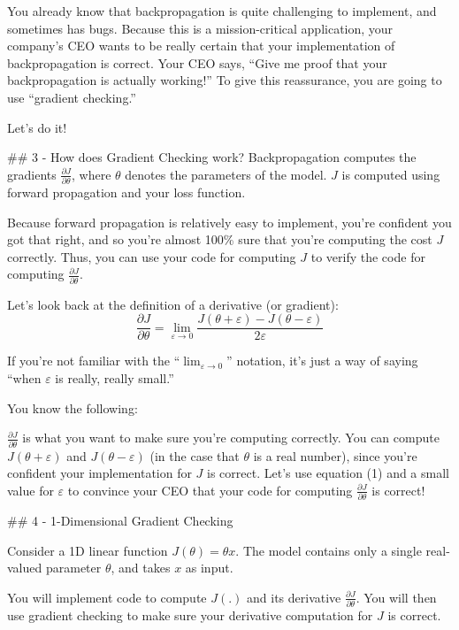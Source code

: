 \documentclass[11pt]{article}
\begin{document}
You already know that backpropagation is quite challenging to implement,
and sometimes has bugs. Because this is a mission-critical application,
your company's CEO wants to be really certain that your implementation
of backpropagation is correct. Your CEO says, ``Give me proof that your
backpropagation is actually working!'' To give this reassurance, you are
going to use ``gradient checking.''

Let's do it!

    \#\# 3 - How does Gradient Checking work? Backpropagation computes the
gradients \(\frac{\partial J}{\partial \theta}\), where \(\theta\)
denotes the parameters of the model. \(J\) is computed using forward
propagation and your loss function.

Because forward propagation is relatively easy to implement, you're
confident you got that right, and so you're almost 100\% sure that
you're computing the cost \(J\) correctly. Thus, you can use your code
for computing \(J\) to verify the code for computing
\(\frac{\partial J}{\partial \theta}\).

Let's look back at the definition of a derivative (or
gradient):\[ \frac{\partial J}{\partial \theta} = \lim_{\varepsilon \to 0} \frac{J(\theta + \varepsilon) - J(\theta - \varepsilon)}{2 \varepsilon} \tag{1}\]

If you're not familiar with the
``\(\displaystyle \lim_{\varepsilon \to 0}\)'' notation, it's just a way
of saying ``when \(\varepsilon\) is really, really small.''

You know the following:

\(\frac{\partial J}{\partial \theta}\) is what you want to make sure
you're computing correctly. You can compute \(J(\theta + \varepsilon)\)
and \(J(\theta - \varepsilon)\) (in the case that \(\theta\) is a real
number), since you're confident your implementation for \(J\) is
correct. Let's use equation (1) and a small value for \(\varepsilon\) to
convince your CEO that your code for computing
\(\frac{\partial J}{\partial \theta}\) is correct!

    \#\# 4 - 1-Dimensional Gradient Checking

Consider a 1D linear function \(J(\theta) = \theta x\). The model
contains only a single real-valued parameter \(\theta\), and takes \(x\)
as input.

You will implement code to compute \(J(.)\) and its derivative
\(\frac{\partial J}{\partial \theta}\). You will then use gradient
checking to make sure your derivative computation for \(J\) is correct.
\end{document}
